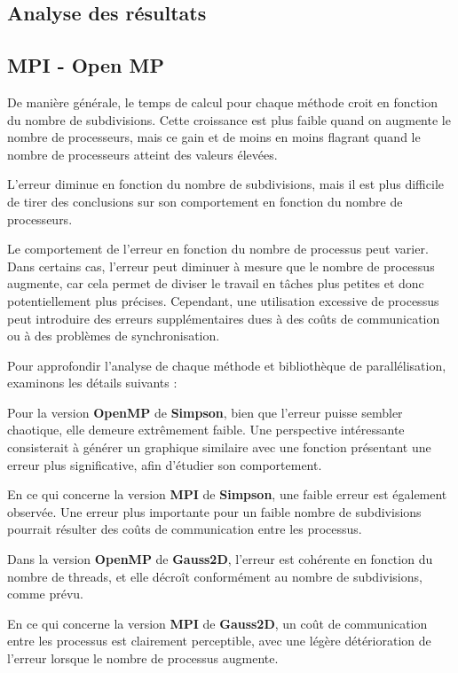 \documentclass[10pt,a4paper]{article}
\begin{document}
\subsection{Analyse des résultats} \label{sec:analyse}
\subsection*{MPI - Open MP}
De manière générale, le temps de calcul pour chaque méthode croit en fonction du nombre de subdivisions. Cette croissance est plus faible quand on augmente le nombre de processeurs, mais ce gain et de moins en moins flagrant quand le nombre de processeurs atteint des valeurs élevées.

L'erreur diminue en fonction du nombre de subdivisions, mais il est plus difficile de tirer des conclusions sur son comportement en fonction du nombre de processeurs. 

Le comportement de l'erreur en fonction du nombre de processus peut varier.
Dans certains cas, l'erreur peut diminuer à mesure que le nombre de processus augmente, car cela permet de diviser le travail en tâches plus petites et donc potentiellement plus précises.
Cependant, une utilisation excessive de processus peut introduire des erreurs supplémentaires dues à des coûts de communication ou à des problèmes de synchronisation.

Pour approfondir l'analyse de chaque méthode et bibliothèque de parallélisation, examinons les détails suivants :

Pour la version \textbf{OpenMP} de \textbf{Simpson}, bien que l'erreur puisse sembler chaotique, elle demeure extrêmement faible. Une perspective intéressante consisterait à générer un graphique similaire avec une fonction présentant une erreur plus significative, afin d'étudier son comportement.

En ce qui concerne la version \textbf{MPI} de \textbf{Simpson}, une faible erreur est également observée. Une erreur plus importante pour un faible nombre de subdivisions pourrait résulter des coûts de communication entre les processus.

Dans la version \textbf{OpenMP} de \textbf{Gauss2D}, l'erreur est cohérente en fonction du nombre de threads, et elle décroît conformément au nombre de subdivisions, comme prévu.

En ce qui concerne la version \textbf{MPI} de \textbf{Gauss2D}, un coût de communication entre les processus est clairement perceptible, avec une légère détérioration de l'erreur lorsque le nombre de processus augmente.
\end{document}
